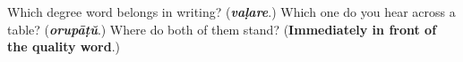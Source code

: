 \begin{tcolorbox}[breakable,colback=teal!4,colframe=teal!35!black,title={Before you move on}]
Which degree word belongs in writing? (\emph{\textbf{vaḷare}}.) Which one do you hear across a table? (\emph{\textbf{orupāṭŭ}}.) Where do both of them stand? (\textbf{Immediately in front of the quality word}.)
\end{tcolorbox}

